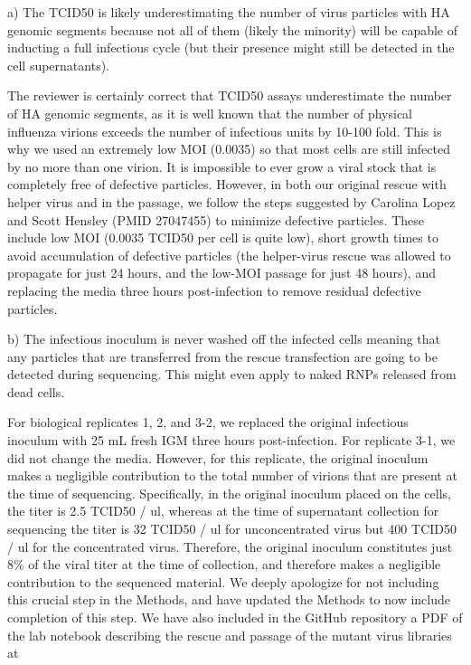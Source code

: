 \documentclass[11pt, oneside]{article}   	%
\newcommand{\response}[1]{{\color{black}#1}}
\begin{document}
a) The TCID50 is likely underestimating the number of virus particles with HA genomic segments because not all of them (likely the minority) will be capable of inducting a full infectious cycle (but their presence might still be detected in the cell supernatants). 

\response{The reviewer is certainly correct that TCID50 assays underestimate the number of HA genomic segments, as it is well known that the number of physical influenza virions exceeds the number of infectious units by 10-100 fold.
This is why we used an extremely low MOI (0.0035) so that most cells are still infected by no more than one virion.
It is impossible to ever grow a viral stock that is completely free of defective particles.
However, in both our original rescue with helper virus and in the passage, we follow the steps suggested by Carolina Lopez and Scott Hensley (PMID 27047455) to minimize defective particles.
These include low MOI (0.0035 TCID50 per cell is quite low), short growth times to avoid accumulation of defective particles (the helper-virus rescue was allowed to propagate for just 24 hours, and the low-MOI passage for just 48 hours), and replacing the media three hours post-infection to remove residual defective particles.
}

b) The infectious inoculum is never washed off the infected cells meaning that any particles that are transferred from the rescue transfection are going to be detected during sequencing. This might even apply to naked RNPs released from dead cells. 

\response{For biological replicates 1, 2, and 3-2, we replaced the original infectious inoculum with 25 mL fresh IGM three hours post-infection.
For replicate 3-1, we did not change the media. 
However, for this replicate, the original inoculum makes a negligible contribution to the total number of virions that are present at the time of sequencing.
Specifically, in the original inoculum placed on the cells, the titer is 2.5 TCID50 / ul, whereas at the time of supernatant collection for sequencing the titer is 32 TCID50 / ul for unconcentrated virus but 400 TCID50 / ul for the concentrated virus.
Therefore, the original inoculum constitutes just 8\% of the viral titer at the time of collection, and therefore makes a negligible contribution to the sequenced material.
We deeply apologize for not including this crucial step in the Methods, and have updated the Methods to now include completion of this step. 
We have also included in the GitHub repository a PDF of the lab notebook describing the rescue and passage of the mutant virus libraries at %
}
\end{document}
